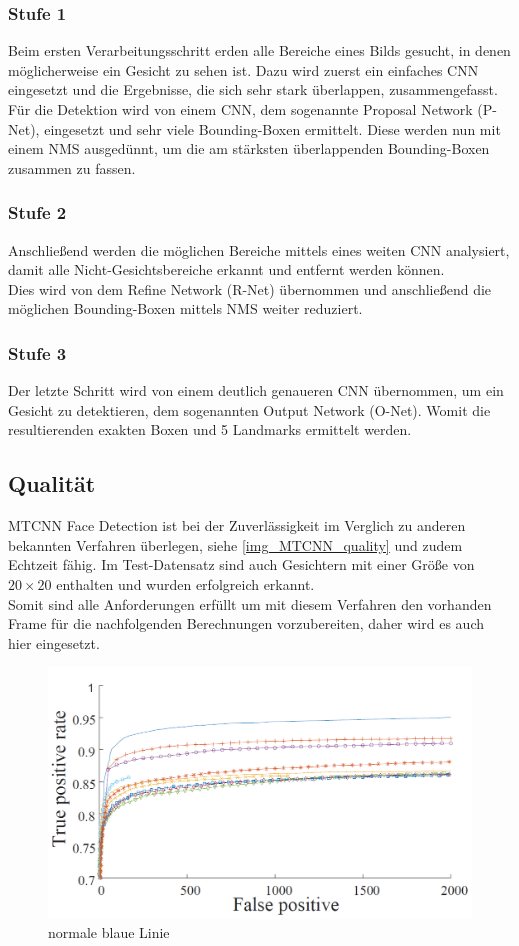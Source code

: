 \subsubsection{Stufe 1}
Beim ersten Verarbeitungsschritt erden alle Bereiche eines Bilds gesucht, in denen möglicherweise ein Gesicht zu sehen ist. Dazu wird zuerst ein einfaches CNN eingesetzt und die Ergebnisse, die sich sehr stark überlappen, zusammengefasst.\\
Für die Detektion wird von einem CNN, dem sogenannte Proposal Network (P-Net), eingesetzt und sehr viele Bounding-Boxen ermittelt. Diese werden nun mit einem NMS ausgedünnt, um die am stärksten überlappenden Bounding-Boxen zusammen zu fassen.
\subsubsection{Stufe 2}
Anschließend werden die möglichen Bereiche mittels eines weiten CNN analysiert, damit alle Nicht-Gesichtsbereiche erkannt und entfernt werden können.\\
Dies wird von dem Refine Network (R-Net) übernommen und anschließend die möglichen Bounding-Boxen mittels NMS weiter reduziert.
\subsubsection{Stufe 3}
Der letzte Schritt wird von einem deutlich genaueren CNN übernommen, um ein Gesicht zu detektieren, dem sogenannten Output Network (O-Net). Womit die resultierenden exakten Boxen und 5 Landmarks ermittelt werden.
\subsection{Qualität}
MTCNN Face Detection ist bei der Zuverlässigkeit im Verglich zu anderen bekannten Verfahren überlegen, siehe \autoref{img_MTCNN_quality} und zudem Echtzeit fähig. Im Test-Datensatz sind auch Gesichtern mit einer Größe von $20\times 20$ enthalten und wurden erfolgreich erkannt.\\
Somit sind alle Anforderungen erfüllt um mit diesem Verfahren den vorhanden Frame für die nachfolgenden Berechnungen vorzubereiten, daher wird es auch hier eingesetzt.
\begin{figure}
	\centering
	\includegraphics[width=0.5\linewidth]{img/MTCNN_quality}
	\caption{normale blaue Linie\cite{MTCCN}}
	\label{img_MTCNN_quality}
\end{figure}
